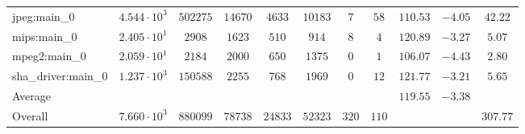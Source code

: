 \begin{tabular}{|l|c|c|c|c|c|c|c|c|c|c|}
jpeg:main\_0            & $ 4.544 \cdot 10^{3} $ & $ 502275 $ & $ 14670 $ & $ 4633  $ & $ 10183 $ & $ 7   $ & $ 58  $ & $ 110.53      $ & $ -4.05   $ & $ 42.22   $ \\
mips:main\_0            & $ 2.405 \cdot 10^{1} $ & $ 2908   $ & $ 1623  $ & $ 510   $ & $ 914   $ & $ 8   $ & $ 4   $ & $ 120.89      $ & $ -3.27   $ & $ 5.07    $ \\
mpeg2:main\_0           & $ 2.059 \cdot 10^{1} $ & $ 2184   $ & $ 2000  $ & $ 650   $ & $ 1375  $ & $ 0   $ & $ 1   $ & $ 106.07      $ & $ -4.43   $ & $ 2.80    $ \\
sha\_driver:main\_0     & $ 1.237 \cdot 10^{3} $ & $ 150588 $ & $ 2255  $ & $ 768   $ & $ 1969  $ & $ 0   $ & $ 12  $ & $ 121.77      $ & $ -3.21   $ & $ 5.65    $ \\
\hline
Average                 & $                    $ & $        $ & $       $ & $       $ & $       $ & $     $ & $     $ & $ 119.55      $ & $ -3.38   $ & $         $ \\
\hline
Overall                 & $ 7.660 \cdot 10^{3} $ & $ 880099 $ & $ 78738 $ & $ 24833 $ & $ 52323 $ & $ 320 $ & $ 110 $ & $             $ & $         $ & $ 307.77  $ \\
\hline
\end{tabular}
